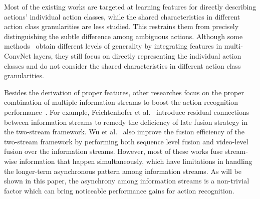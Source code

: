 \documentclass[letterpaper]{article} %
\begin{document}
Most of the existing works are targeted at learning features for directly describing actions' individual action classes, while the shared characteristics in different action class granularities are less studied. This restrains them from precisely distinguishing the subtle difference among ambiguous actions. Although some methods~\cite{jointattention} obtain different levels of generality by integrating features in multi-ConvNet layers, they still focus on directly representing the individual action classes and do not consider the shared characteristics in different action class granularities.


Besides the derivation of proper features, other researches focus on the proper combination of multiple information streams to boost the action recognition performance~\cite{nips,wumultifusion,twostreamfuse,lstmiccv2017}. For example, Feichtenhofer et al.~\cite{nips} introduce residual connections between information streams to remedy the deficiency of late fusion strategy in the two-stream framework. Wu et al.~\cite{wumultifusion} also improve the fusion efficiency of the two-stream framework by performing both sequence level fusion and video-level fusion over the information streams. However, most of these works fuse stream-wise information that happen simultaneously, which have limitations in handling the longer-term asynchronous pattern among information streams. As will be shown in this paper, the asynchrony among information streams is a non-trivial factor which can bring noticeable performance gains for action recognition.
\end{document}
